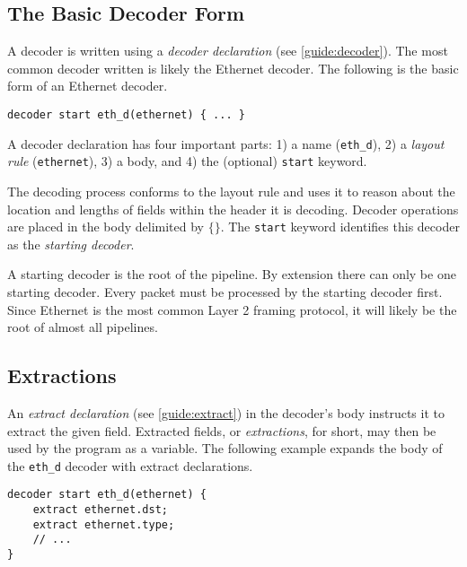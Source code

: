 \subsection{The Basic Decoder Form} \label{tut:basic_decoder}

A decoder is written using a \textit{decoder declaration} (see \ref{guide:decoder}).
The most common decoder written is likely the Ethernet decoder. The following
is the basic form of an Ethernet decoder.

\begin{codepage}
\begin{lstlisting}
decoder start eth_d(ethernet) { ... }
\end{lstlisting}
\end{codepage}

A decoder declaration has four important parts: 
1) a name (\texttt{eth\_d}), 
2) a \textit{layout rule} (\texttt{ethernet}),
3) a body, and
4) the (optional) \texttt{start} keyword.

The decoding process conforms to the layout rule and uses it to reason
about the location and lengths of fields within the header it is decoding.
Decoder operations are placed in the body delimited by $\lbrace\rbrace$.
The \texttt{start} keyword identifies this decoder as the \emph{starting
decoder}. 

A starting decoder is the root of the pipeline.
By extension there can only be one starting decoder.
Every packet must be processed by the starting decoder first.
Since Ethernet is the most common Layer 2 framing protocol, it will
likely be the root of almost all pipelines.

\subsection{Extractions} \label{tut:decoder_extract}

An \textit{extract declaration} (see \ref{guide:extract}) in the decoder's body
instructs it to extract the given field. Extracted fields, or \emph{extractions},
for short, may then be used by the program as a variable.
The following example expands the body of the \texttt{eth\_d} decoder 
with extract declarations.

\begin{codepage}
\begin{lstlisting}
decoder start eth_d(ethernet) {
	extract ethernet.dst;
	extract ethernet.type;
	// ...
}
\end{lstlisting}
\end{codepage}

